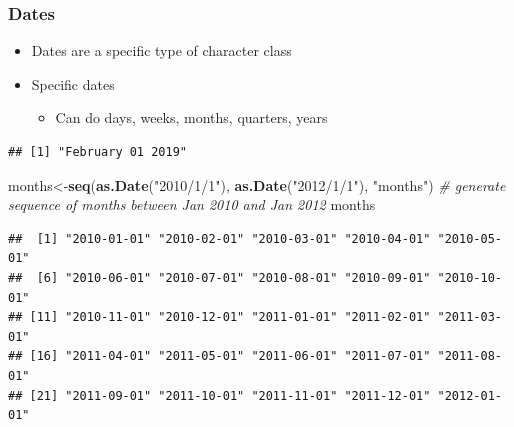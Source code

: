 \documentclass[]{book}
\newenvironment{Shaded}{\begin{snugshade}}{\end{snugshade}}
\newcommand{\KeywordTok}[1]{\textcolor[rgb]{0.13,0.29,0.53}{\textbf{#1}}}
\newcommand{\DataTypeTok}[1]{\textcolor[rgb]{0.13,0.29,0.53}{#1}}
\newcommand{\StringTok}[1]{\textcolor[rgb]{0.31,0.60,0.02}{#1}}
\newcommand{\CommentTok}[1]{\textcolor[rgb]{0.56,0.35,0.01}{\textit{#1}}}
\newcommand{\NormalTok}[1]{#1}
\providecommand{\tightlist}{%
  \setlength{\itemsep}{0pt}\setlength{\parskip}{0pt}}
\theoremstyle{definition}
\theoremstyle{definition}
\theoremstyle{definition}
\theoremstyle{remark}
\begin{document}
\subsubsection{Dates}\label{dates}

\begin{itemize}
\tightlist
\item
  Dates are a specific type of character class
\item
  Specific dates

  \begin{itemize}
  \tightlist
  \item
    Can do days, weeks, months, quarters, years
  \end{itemize}
\end{itemize}

\begin{Shaded}
\end{Shaded}

\begin{verbatim}
## [1] "February 01 2019"
\end{verbatim}

\begin{Shaded}
\begin{Highlighting}[]
\NormalTok{months<-}\KeywordTok{seq}\NormalTok{(}\KeywordTok{as.Date}\NormalTok{(}\StringTok{"2010/1/1"}\NormalTok{), }\KeywordTok{as.Date}\NormalTok{(}\StringTok{"2012/1/1"}\NormalTok{), }\StringTok{"months"}\NormalTok{) }\CommentTok{# generate sequence of months between Jan 2010 and Jan 2012}
\NormalTok{months}
\end{Highlighting}
\end{Shaded}

\begin{verbatim}
##  [1] "2010-01-01" "2010-02-01" "2010-03-01" "2010-04-01" "2010-05-01"
##  [6] "2010-06-01" "2010-07-01" "2010-08-01" "2010-09-01" "2010-10-01"
## [11] "2010-11-01" "2010-12-01" "2011-01-01" "2011-02-01" "2011-03-01"
## [16] "2011-04-01" "2011-05-01" "2011-06-01" "2011-07-01" "2011-08-01"
## [21] "2011-09-01" "2011-10-01" "2011-11-01" "2011-12-01" "2012-01-01"
\end{verbatim}
\end{document}
